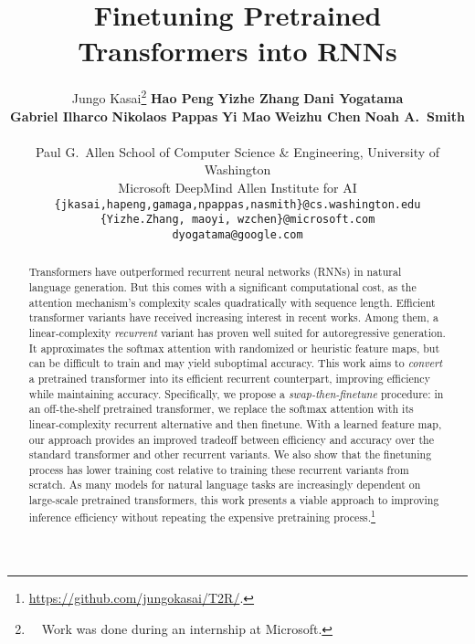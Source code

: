 \documentclass[11pt]{article}
\title{Finetuning Pretrained Transformers into RNNs}
\author{
    Jungo Kasai\thanks{\ \ Work was done during an internship at Microsoft.}  
\quad
\quad 
\textbf{Hao Peng}
\quad 
\quad 
\textbf{Yizhe Zhang}
\quad 
\textbf{Dani Yogatama}\\
\textbf{Gabriel Ilharco} 
\quad
\textbf{Nikolaos Pappas} 
\quad 
\textbf{Yi Mao}
\quad 
\textbf{Weizhu Chen}
\quad
	\textbf{Noah A.\ Smith}\\
\\
    Paul G.\ Allen School of Computer Science \& Engineering, University of Washington
    \\
    Microsoft
\quad DeepMind
\quad Allen Institute for AI\\
    {\tt \{jkasai,hapeng,gamaga,npappas,nasmith\}@cs.washington.edu}\\
    {\tt \{Yizhe.Zhang, maoyi, wzchen\}@microsoft.com}\\
    {\tt dyogatama@google.com}
}
\begin{document}
\setlength{\abovedisplayskip}{4pt}
\setlength{\belowdisplayskip}{4pt}
\setlength{\abovedisplayshortskip}{4pt}
\setlength{\belowdisplayshortskip}{4pt}
\maketitle
\begin{abstract}
Transformers have outperformed recurrent neural networks (RNNs) in natural language generation.
But this comes with a significant computational cost, as the attention mechanism's complexity scales quadratically with sequence length.
Efficient transformer variants have received increasing interest in recent works. 
Among them, a linear-complexity \emph{recurrent} variant has proven well suited for autoregressive generation.
It approximates the softmax attention with randomized or heuristic feature maps,
but can be difficult to train and may yield suboptimal accuracy.
This work aims to \emph{convert} a pretrained transformer into its efficient recurrent counterpart,
improving efficiency while maintaining  accuracy.
Specifically, we propose a \textit{swap-then-finetune} procedure:
in an off-the-shelf pretrained transformer, 
we replace the softmax attention with its linear-complexity recurrent alternative
and then finetune.
With a learned feature map, our approach 
provides an improved tradeoff between efficiency and accuracy over the standard transformer and other recurrent variants.
We also show that the finetuning process has lower training cost relative to training these recurrent variants from scratch.
As many models for natural language tasks are increasingly dependent on large-scale pretrained transformers, this work presents a viable approach to improving inference efficiency without repeating the expensive pretraining process.\footnote{\url{https://github.com/jungokasai/T2R/}.}

\end{abstract}
\end{document}
